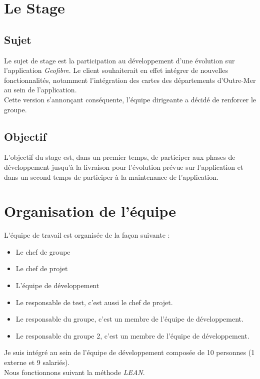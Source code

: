 \chapter{Le Stage}
\section{Sujet}

Le sujet de stage est la participation au développement d'une évolution sur l'application \textit{Geofibre}.
Le client souhaiterait en effet intégrer de nouvelles fonctionnalités, notamment l'intégration des cartes des départements d'Outre-Mer au sein de l'application.
\\Cette version s'annonçant conséquente, l'équipe dirigeante a décidé de renforcer le groupe.

\section{Objectif}


L'objectif du stage est, dans un premier temps, de participer aux phases de développement jusqu'à la livraison pour l'évolution prévue sur l'application et dans un second temps de participer à la maintenance de l'application.

\chapter{Organisation de l'équipe}

L'équipe de travail est organisée de la façon suivante :\\

\begin{itemize}
  \item Le chef de groupe
  \item Le chef de projet
  \item L'équipe de développement
  \item Le responsable de test, c'est aussi le chef de projet.
  \item Le responsable du groupe, c'est un membre de l'équipe de développement.
  \item Le responsable du groupe 2, c'est un membre de l'équipe de développement.\\
\end{itemize}
Je suis intégré au sein de l'équipe de développement composée de 10 personnes (1 externe et 9 salariés).
\\Nous fonctionnons suivant la méthode \textit{LEAN}.

